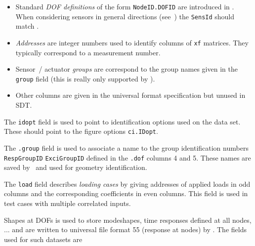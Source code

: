 \begin{itemize} 
\item Standard {\sl DOF definitions} of the form {\tt NodeID.DOFID} are introduced in . When considering sensors in general directions (see~) the {\tt SensId} should match . 
\item {\sl Addresses} are integer numbers used to identify columns of {\tt xf} matrices. They typically correspond to a measurement number.
\item Sensor~/ actuator {\sl groups} are correspond to the group names given in the {\tt group} field (this is really only supported by \ufread). 
\item Other columns are given in the universal format specification but unused in SDT. 
\end{itemize}

The {\tt idopt} field is used to point to identification options used on the data set. These should point to the figure options {\tt ci.IDopt}.

The {\tt .group} field is used to associate a name to the group identification numbers {\tt RespGroupID} {\tt ExciGroupID} defined in the {\tt .dof} columns 4 and 5. These names are saved by \ufwrite\ and used for geometry identification.

The {\tt load} field describes {\sl loading cases} by giving addresses of applied loads in odd columns and the corresponding coefficients in even columns. This field is used in test cases with multiple correlated inputs.


Shapes at DOFs is used to store modeshapes, time responses defined at all nodes, ... and are written to universal file format 55 (response at nodes) by \ufwrite. The fields used for such datasets are

